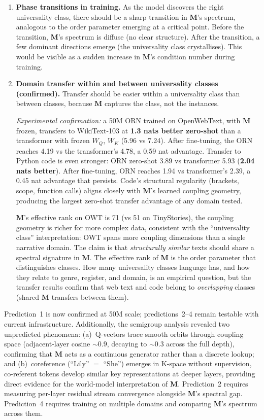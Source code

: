 \documentclass[11pt, a4paper]{article}
\newcommand{\M}{\mathbf{M}}
\theoremstyle{remark}
\begin{document}
\begin{enumerate}[nosep]
    \item \textbf{Phase transitions in training.}
    As the model discovers the right universality class, there should be a sharp transition in $\M$'s spectrum, analogous to the order parameter emerging at a critical point.
    Before the transition, $\M$'s spectrum is diffuse (no clear structure).
    After the transition, a few dominant directions emerge (the universality class crystallises).
    This would be visible as a sudden increase in $\M$'s condition number during training.

    \item \textbf{Domain transfer within and between universality classes (confirmed).}
    Transfer should be easier within a universality class than between classes, because $\M$ captures the class, not the instances.

    \textit{Experimental confirmation:} a 50M ORN trained on OpenWebText, with $\M$ frozen, transfers to WikiText-103 at \textbf{1.3 nats better zero-shot} than a transformer with frozen $W_Q$, $W_K$ (5.96 vs 7.24).
    After fine-tuning, the ORN reaches 4.19 vs the transformer's 4.78, a 0.59 nat advantage.
    Transfer to Python code is even stronger: ORN zero-shot 3.89 vs transformer 5.93 (\textbf{2.04 nats better}).
    After fine-tuning, ORN reaches 1.94 vs transformer's 2.39, a 0.45 nat advantage that persists.
    Code's structural regularity (brackets, scope, function calls) aligns closely with $\M$'s learned coupling geometry, producing the largest zero-shot transfer advantage of any domain tested.

    $\M$'s effective rank on OWT is 71 (vs 51 on TinyStories), the coupling geometry is richer for more complex data, consistent with the ``universality class'' interpretation: OWT spans more coupling dimensions than a single narrative domain.
    The claim is that \emph{structurally similar} texts should share a spectral signature in $\M$.
    The effective rank of $\M$ is the order parameter that distinguishes classes.
    How many universality classes language has, and how they relate to genre, register, and domain, is an empirical question, but the transfer results confirm that web text and code belong to \emph{overlapping} classes (shared $\M$ transfers between them).
\end{enumerate}

Prediction~1 is now confirmed at 50M scale; predictions~2--4 remain testable with current infrastructure.
Additionally, the semigroup analysis revealed two unpredicted phenomena: (a)~Q-vectors trace smooth orbits through coupling space (adjacent-layer cosine ${\sim}0.9$, decaying to ${\sim}0.3$ across the full depth), confirming that $\M$ acts as a continuous generator rather than a discrete lookup; and (b)~coreference (``Lily'' $=$ ``She'') emerges in K-space without supervision, co-referent tokens develop similar key representations at deeper layers, providing direct evidence for the world-model interpretation of $\M$.
Prediction~2 requires measuring per-layer residual stream convergence alongside $\M$'s spectral gap.
Prediction~4 requires training on multiple domains and comparing $\M$'s spectrum across them.
\end{document}
